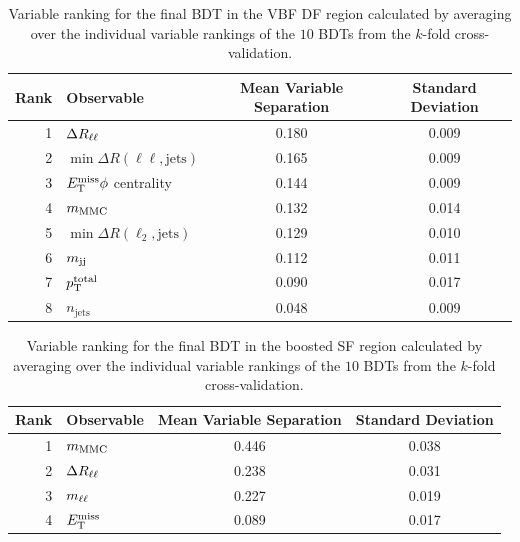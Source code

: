 \begin{table}[htpb]
    \centering
    \caption{Variable ranking for the final BDT in the VBF DF region calculated by averaging over the individual
             variable rankings of the $10$ BDTs from the $k$-fold cross-validation.}\label{tab:mva:variables:ranking:VBFDF}
    \begin{tabular}{rlcc}
        \toprule
        Rank & Observable & Mean Variable Separation & Standard Deviation \\ \midrule
        1 & $\Delta R_{\ell\ell}$ & 0.180 & 0.009 \\
        2 & $\min \Delta R (\ell\ell, \text{jets})$ & 0.165 & 0.009 \\
        3 & $E_\text{T}^\text{miss} \phi$ centrality & 0.144 & 0.009 \\
        4 & $m_\text{MMC}$ & 0.132 & 0.014 \\
        5 & $\min \Delta R (\ell_2, \text{jets})$ & 0.129 & 0.010 \\
        6 & $m_{\text{jj}}$ & 0.112 & 0.011 \\
        7 & $p_\text{T}^\text{total}$ & 0.090 & 0.017 \\
        8 & $n_\text{jets}$ & 0.048 & 0.009 \\
        \bottomrule
    \end{tabular}
\end{table}
\begin{table}[htpb]
    \centering
    \caption{Variable ranking for the final BDT in the boosted SF region calculated by averaging over the individual
             variable rankings of the $10$ BDTs from the $k$-fold cross-validation.}\label{tab:mva:variables:ranking:BOOSTSF}
    \begin{tabular}{rlcc}
        \toprule
        Rank & Observable & Mean Variable Separation & Standard Deviation \\ \midrule
        1 & $m_\text{MMC}$ & 0.446 & 0.038 \\
        2 & $\Delta R_{\ell\ell}$ & 0.238 & 0.031 \\
        3 & $m_{\ell\ell}$ & 0.227 & 0.019 \\
        4 & $E_\text{T}^\text{miss}$ & 0.089 & 0.017 \\
        \bottomrule
    \end{tabular}
\end{table}
